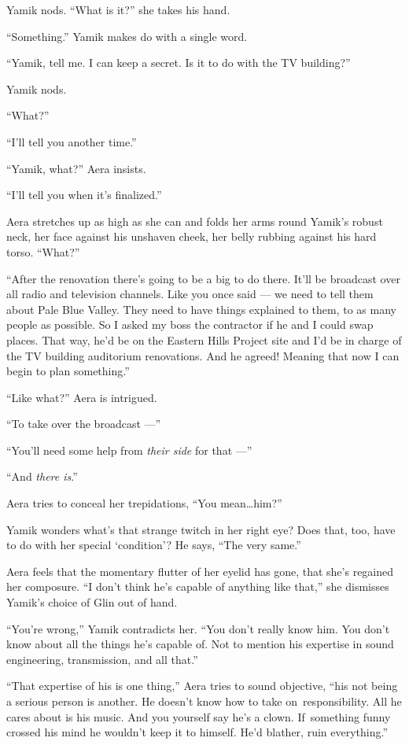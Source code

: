 \documentclass[twoside,11pt,openany]{book}
\begin{document}
Yamik nods.  ``What is it?'' she takes his hand.

``Something.'' Yamik makes do with a single word.

``Yamik, tell me. I can keep a secret. Is it to do with the TV building?''

Yamik nods.

``What?''

``I'll tell you another time.''

``Yamik, what?'' Aera insists.

``I'll tell you when it's finalized.''

Aera stretches up as high as she can and folds her arms round Yamik's robust neck, her face against his unshaven cheek,
her belly rubbing against his hard torso. ``What?''

``After the renovation there's going to be a big to do there. It'll be broadcast over all radio and
television channels. Like you once said --- we need to tell them about Pale Blue Valley. They need to have things
explained to them, to as many people as possible.  So I asked my boss the contractor if he and I could swap places.
That way, he'd be on the Eastern Hills Project site and I'd be in charge of the TV building auditorium renovations. And
he agreed!  Meaning that now I can begin to plan something.''

``Like what?'' Aera is intrigued.

``To take over the broadcast ---''

``You'll need some help from \textit{their side }for that ---''

``And \textit{there is}.''

Aera tries to conceal her trepidations, ``You mean{\ldots}him?''

Yamik wonders what's that strange twitch in her right eye? Does that, too, have to do with her special `condition'? He
says, ``The very same.''

Aera feels that the momentary flutter of her eyelid has gone, that she's regained her composure. ``I don't
think he's capable of anything like that,'' she dismisses Yamik's choice of Glin out of hand.

``You're wrong,'' Yamik contradicts her. ``You don't really know him. You don't
know about all the things he's capable of. Not to mention his expertise in sound engineering, transmission, and all
that.''

``That expertise of his is one thing,'' Aera tries to sound objective, ``his not
being a serious person is another.  He doesn't know how to take on~responsibility. All he cares about is his music.
And you yourself say he's a clown. If~something funny crossed his mind he wouldn't keep it to himself. He'd blather,
ruin everything.''
\end{document}

